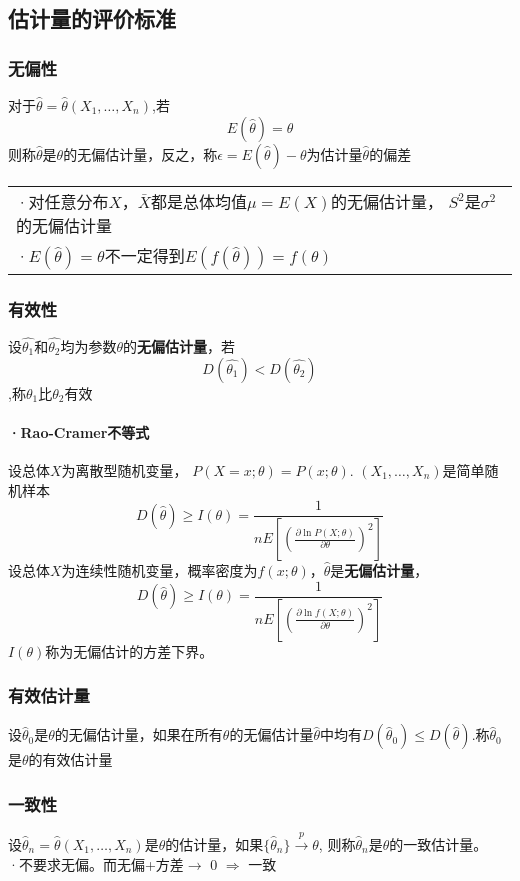 \documentclass[a4paper]{ctexart}
\begin{document}
\subsection{估计量的评价标准}
\subsubsection{无偏性}
对于$\hat{\theta}=\hat{\theta}(X_1,\ldots,X_n)$,若
\[E(\hat{\theta})=\theta\]
则称$\hat{\theta}$是$\theta$的无偏估计量，反之，称$\epsilon=E(\hat{\theta})-\theta$为估计量$\hat{\theta}$的偏差
\begin{tabular}{l}
    ·对任意分布$X$，$\bar X$都是总体均值$\mu=E(X)$的无偏估计量， $S^2$是$\sigma^2$的无偏估计量 \\
    ·$E(\hat\theta)=\theta$不一定得到$E(f(\hat{\theta}))=f(\theta)$
\end{tabular}
\subsubsection{有效性}
设$\hat{\theta_1}$和$\hat{\theta_2}$均为参数$\theta$的\textbf{无偏估计量}，若\[D(\hat{\theta_1})<D(\hat{\theta_2})\],称$\theta_1$比$\theta_2$有效\\
\paragraph{·Rao-Cramer不等式\\}
设总体$X$为离散型随机变量， $P(X=x;\theta)=P(x;\theta)$. $(X_1,\ldots,X_n)$是简单随机样本
\begin{equation}
    D(\hat{\theta})\geq I(\theta)=\frac{1}{nE[\displaystyle(\frac{\partial \ln P(X;\theta)}{\partial \theta})^2]}
\end{equation}
设总体$X$为连续性随机变量，概率密度为$f(x;\theta)$，$\hat{\theta}$是\textbf{无偏估计量}，
\begin{equation}
    D(\hat{\theta})\geq I(\theta)=\frac{1}{nE[(\displaystyle\frac{\partial \ln f(X;\theta)}{\partial \theta})^2]}
\end{equation}
$I(\theta)$称为无偏估计的方差下界。
\subsubsection{有效估计量}
设$\hat\theta_0$是$\theta$的无偏估计量，如果在所有$\theta$的无偏估计量$\hat\theta$中均有$D(\hat\theta_0)\leq D(\hat\theta)$.称$\hat \theta_0$是$\theta$的有效估计量
\subsubsection{一致性}
设$\hat\theta_n=\hat\theta(X_1,\ldots,X_n)$是$\theta$的估计量，如果$\{\hat\theta_n\}\xrightarrow{p} \theta$, 则称$\hat{\theta}_n$是$\theta$的一致估计量。\\
·不要求无偏。而无偏+方差$\rightarrow$ 0 $\Longrightarrow$ 一致
\end{document}
